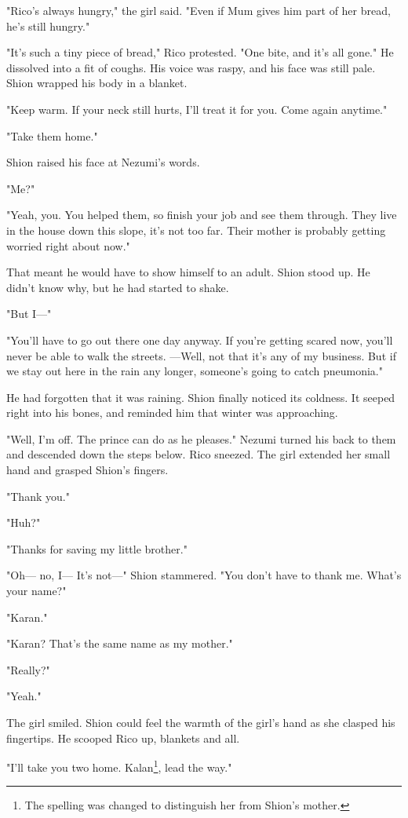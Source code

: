 "Rico's always hungry," the girl said. "Even if Mum gives him part of
her bread, he's still hungry."

"It's such a tiny piece of bread," Rico protested. "One bite, and it's
all gone." He dissolved into a fit of coughs. His voice was raspy, and
his face was still pale. Shion wrapped his body in a blanket.

"Keep warm. If your neck still hurts, I'll treat it for you. Come again
anytime."

"Take them home."

Shion raised his face at Nezumi's words.

"Me?"

"Yeah, you. You helped them, so finish your job and see them through.
They live in the house down this slope, it's not too far. Their mother
is probably getting worried right about now."

That meant he would have to show himself to an adult. Shion stood up. He
didn't know why, but he had started to shake.

"But I---"

"You'll have to go out there one day anyway. If you're getting scared
now, you'll never be able to walk the streets. ---Well, not that it's any
of my business. But if we stay out here in the rain any longer,
someone's going to catch pneumonia."

He had forgotten that it was raining. Shion finally noticed its
coldness. It seeped right into his bones, and reminded him that winter
was approaching.

"Well, I'm off. The prince can do as he pleases." Nezumi turned his back
to them and descended down the steps below. Rico sneezed. The girl
extended her small hand and grasped Shion's fingers.

"Thank you."

"Huh?"

"Thanks for saving my little brother."

"Oh--- no, I--- It's not---" Shion stammered. "You don't have to thank me.
What's your name?"

"Karan."

"Karan? That's the same name as my mother."

"Really?"

"Yeah."

The girl smiled. Shion could feel the warmth of the girl's hand as she
clasped his fingertips. He scooped Rico up, blankets and all.

"I'll take you two home. Kalan\footnote{The spelling was changed to distinguish her from Shion's mother.}, lead the way."


